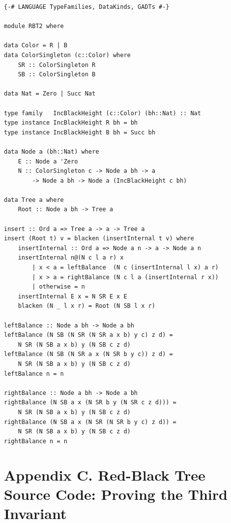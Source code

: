 \documentclass{tmr}
\begin{document}
\begin{Verbatim}
{-# LANGUAGE TypeFamilies, DataKinds, GADTs #-}

module RBT2 where

data Color = R | B
data ColorSingleton (c::Color) where
    SR :: ColorSingleton R
    SB :: ColorSingleton B

data Nat = Zero | Succ Nat

type family   IncBlackHeight (c::Color) (bh::Nat) :: Nat
type instance IncBlackHeight R bh = bh
type instance IncBlackHeight B bh = Succ bh

data Node a (bh::Nat) where
    E :: Node a 'Zero
    N :: ColorSingleton c -> Node a bh -> a
        -> Node a bh -> Node a (IncBlackHeight c bh)

data Tree a where
    Root :: Node a bh -> Tree a

insert :: Ord a => Tree a -> a -> Tree a
insert (Root t) v = blacken (insertInternal t v) where
    insertInternal :: Ord a => Node a n -> a -> Node a n
    insertInternal n@(N c l a r) x
        | x < a = leftBalance  (N c (insertInternal l x) a r)
        | x > a = rightBalance (N c l a (insertInternal r x))
        | otherwise = n
    insertInternal E x = N SR E x E
    blacken (N _ l x r) = Root (N SB l x r)

leftBalance :: Node a bh -> Node a bh
leftBalance (N SB (N SR (N SR a x b) y c) z d) =
    N SR (N SB a x b) y (N SB c z d)
leftBalance (N SB (N SR a x (N SR b y c)) z d) =
    N SR (N SB a x b) y (N SB c z d)
leftBalance n = n

rightBalance :: Node a bh -> Node a bh
rightBalance (N SB a x (N SR b y (N SR c z d))) =
    N SR (N SB a x b) y (N SB c z d)
rightBalance (N SB a x (N SR (N SR b y c) z d)) =
    N SR (N SB a x b) y (N SB c z d)
rightBalance n = n
\end{Verbatim}

\section*{Appendix C. Red-Black Tree Source Code: Proving the Third Invariant}
\label{sec:appendix_c}
\end{document}
